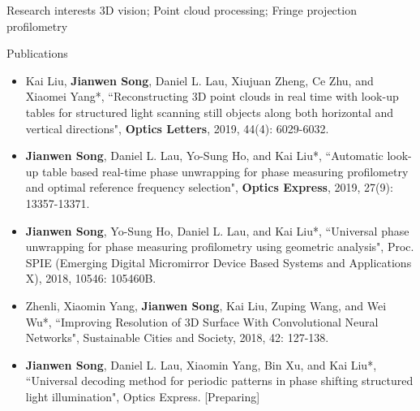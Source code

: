 \documentclass{resume} %
\begin{document}
\begin{rSection}{Research interests}
3D vision; Point cloud processing; Fringe projection profilometry
\end{rSection}
\begin{rSection}{Publications}

\begin{itemize}[leftmargin=*]
\item Kai Liu, {\bf Jianwen Song}, Daniel L. Lau, Xiujuan Zheng, Ce Zhu, and Xiaomei Yang*, ``Reconstructing 3D point clouds in real time with look-up tables for structured light scanning still objects along both horizontal and vertical directions", {\bf Optics Letters}, 2019, 44(4): 6029-6032.
\item {\bf Jianwen Song}, Daniel L. Lau, Yo-Sung Ho, and Kai Liu*, ``Automatic look-up table based real-time phase unwrapping for phase measuring profilometry and optimal reference frequency selection", {\bf Optics Express}, 2019, 27(9): 13357-13371.
\item {\bf Jianwen Song}, Yo-Sung Ho, Daniel L. Lau, and Kai Liu*, ``Universal phase unwrapping for phase measuring profilometry using geometric analysis", Proc. SPIE (Emerging Digital Micromirror Device Based Systems and Applications X), 2018, 10546: 105460B.
\item Zhenli, Xiaomin Yang, {\bf Jianwen Song}, Kai Liu, Zuping Wang, and Wei Wu*, ``Improving Resolution of 3D Surface With Convolutional Neural Networks", Sustainable Cities and Society, 2018, 42: 127-138.
\item {\bf Jianwen Song}, Daniel L. Lau, Xiaomin Yang, Bin Xu, and Kai Liu*, ``Universal decoding method for periodic patterns in phase shifting structured light illumination", Optics Express. [Preparing]
\end{itemize}
\end{rSection}
\end{document}
